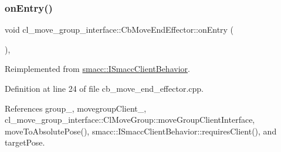 \subsubsection{\texorpdfstring{on\+Entry()}{onEntry()}}
{\footnotesize\ttfamily void cl\+\_\+move\+\_\+group\+\_\+interface\+::\+Cb\+Move\+End\+Effector\+::on\+Entry (\begin{DoxyParamCaption}{ }\end{DoxyParamCaption})\hspace{0.3cm}{\ttfamily [override]}, {\ttfamily [virtual]}}



Reimplemented from \hyperlink{classsmacc_1_1ISmaccClientBehavior_a9877684b1954429719826e2d0924d980}{smacc\+::\+I\+Smacc\+Client\+Behavior}.



Definition at line 24 of file cb\+\_\+move\+\_\+end\+\_\+effector.\+cpp.



References group\+\_\+, movegroup\+Client\+\_\+, cl\+\_\+move\+\_\+group\+\_\+interface\+::\+Cl\+Move\+Group\+::move\+Group\+Client\+Interface, move\+To\+Absolute\+Pose(), smacc\+::\+I\+Smacc\+Client\+Behavior\+::requires\+Client(), and target\+Pose.


